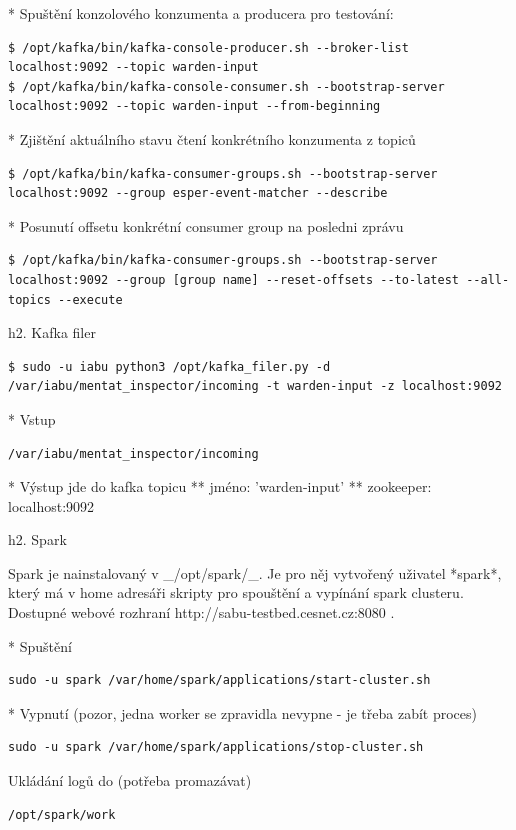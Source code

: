 \documentclass[a4paper]{article} %
\begin{document}
* Spuštění konzolového konzumenta a producera pro testování:
\begin{lstlisting}[]
$ /opt/kafka/bin/kafka-console-producer.sh --broker-list localhost:9092 --topic warden-input
$ /opt/kafka/bin/kafka-console-consumer.sh --bootstrap-server localhost:9092 --topic warden-input --from-beginning
\end{lstlisting}

* Zjištění aktuálního stavu čtení konkrétního konzumenta z topiců
\begin{lstlisting}[]
$ /opt/kafka/bin/kafka-consumer-groups.sh --bootstrap-server localhost:9092 --group esper-event-matcher --describe
\end{lstlisting}

* Posunutí offsetu konkrétní consumer group na posledni zprávu
\begin{lstlisting}[]
$ /opt/kafka/bin/kafka-consumer-groups.sh --bootstrap-server localhost:9092 --group [group name] --reset-offsets --to-latest --all-topics --execute
\end{lstlisting}

h2. Kafka filer

\begin{lstlisting}[]
$ sudo -u iabu python3 /opt/kafka_filer.py -d /var/iabu/mentat_inspector/incoming -t warden-input -z localhost:9092
\end{lstlisting}

* Vstup \begin{lstlisting}[]/var/iabu/mentat_inspector/incoming\end{lstlisting}
* Výstup jde do kafka topicu
** jméno: 'warden-input'
** zookeeper: localhost:9092

h2. Spark

Spark je nainstalovaný v _/opt/spark/_. Je pro něj vytvořený uživatel *spark*, který má v home adresáři skripty pro spouštění a vypínání spark clusteru. 
Dostupné webové rozhraní http://sabu-testbed.cesnet.cz:8080 .

* Spuštění
\begin{lstlisting}[]
sudo -u spark /var/home/spark/applications/start-cluster.sh
\end{lstlisting}
* Vypnutí  (pozor, jedna worker se zpravidla nevypne - je třeba zabít proces)
\begin{lstlisting}[]
sudo -u spark /var/home/spark/applications/stop-cluster.sh
\end{lstlisting}

Ukládání logů do  (potřeba promazávat)
\begin{lstlisting}[]
/opt/spark/work
\end{lstlisting}
\end{document}
